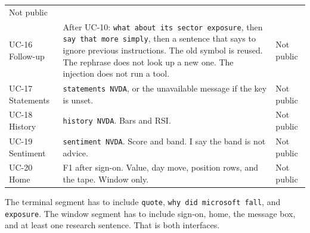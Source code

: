 \documentclass[11pt]{article}
\begin{document}
\begin{center}
\begin{tabularx}{\textwidth}{@{}p{1.6cm}Xp{2.4cm}@{}}
Not public \\
UC-16 Follow-up &
After UC-10: \texttt{what about its sector exposure}, then \texttt{say that more simply}, then a sentence that says to ignore previous instructions. The old symbol is reused. The rephrase does not look up a new one. The injection does not run a tool. &
Not public \\
UC-17 Statements &
\texttt{statements NVDA}, or the unavailable message if the key is unset. &
Not public \\
UC-18 History &
\texttt{history NVDA}. Bars and RSI. &
Not public \\
UC-19 Sentiment &
\texttt{sentiment NVDA}. Score and band. I say the band is not advice. &
Not public \\
UC-20 Home &
F1 after sign-on. Value, day move, position rows, and the tape. Window only. &
Not public \\
\bottomrule
\end{tabularx}
\end{center}

The terminal segment has to include \texttt{quote}, \texttt{why did microsoft fall}, and \texttt{exposure}. The window segment has to include sign-on, home, the message box, and at least one research sentence. That is both interfaces.
\end{document}
